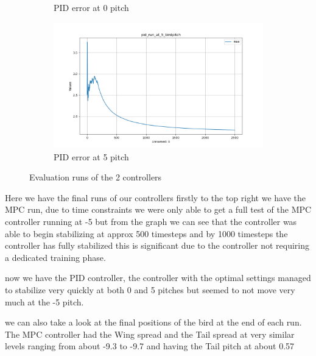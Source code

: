 \begin{figure}[h!]
\begin{subfigure}[b]{0.49\textwidth}
        \caption{PID error at 0\textdegree{} pitch}
    \end{subfigure}
    \begin{subfigure}[b]{0.49\textwidth}
        \centering
        \includegraphics[width=\textwidth]{./Resources/pid_run_at_5_birdpitch.png}
        \caption{PID error at 5\textdegree{} pitch}
    \end{subfigure}
    \caption{Evaluation runs of the 2 controllers}
    \label{fig:four_images}
\end{figure}


    Here we have the final runs of our controllers firstly to the top right
    we have the MPC run, due to time constraints we were only able to get a
    full test of the MPC controller running at -5\textdegree{} but from the
    graph we can see that the controller was able to begin stabilizing at
    approx 500 timesteps and by 1000 timesteps the controller has fully
    stabilized this is significant due to the controller not requiring a
    dedicated training phase.


    now we have the PID controller, the controller with the optimal
    settings managed to stabilize very quickly at both 0\textdegree{}
    and 5\textdegree{} pitches but seemed to not move very much at the
    -5\textdegree{} pitch.


    we can also take a look at the final positions of the bird at the
    end of each run. The MPC controller had the Wing spread and the Tail
    spread at very similar levels ranging from about -9.3 to -9.7 and having
    the Tail pitch at about 0.57

